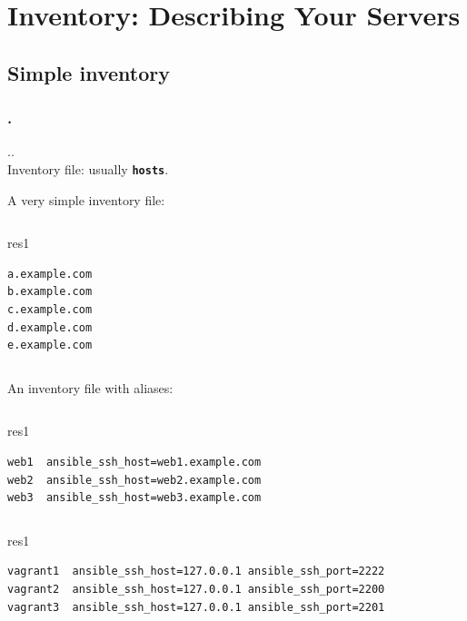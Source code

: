\documentclass[pdf, 8pt, unicode, t]{beamer} %
\newcommand{\bluetext}[1]{{\usebeamercolor[fg]{bluetext_color}#1}}
\newcommand{\myinsertsubsection}{\alert{\Large\insertsectionnumber.\insertsubsectionnumber. \insertsubsection}\\}
\newcommand{\frametitlesection}{\frametitle{\thesection. \secname}}
\begin{document}
\section{Inventory: Describing Your Servers}
\subsection{Simple inventory}
\begin{frame}[fragile]
\frametitlesection
\myinsertsubsection
\vspace{1em}
\bluetext{Inventory file: usually {\bf\texttt{hosts}}.}

\vspace{1em}
A very simple inventory file:
\begin{columns}[t,onlytextwidth]
\hspace{1em}
\begin{beamercolorbox}[dp=1ex,wd=0.43\textwidth,sep=-0.5em,rounded=true,shadow=true,center]{res1}
\begin{Verbatim}[commandchars=\\\{\}]
a.example.com
b.example.com
c.example.com
d.example.com
e.example.com
\end{Verbatim}
\end{beamercolorbox}
\end{columns}

\vspace{1em}
An inventory file with aliases:

\begin{columns}[t,onlytextwidth]
\hspace{1em}
\begin{beamercolorbox}[dp=1ex,wd=0.8\textwidth,sep=-0.5em,rounded=true,shadow=true,center]{res1}
\begin{Verbatim}[commandchars=\\\{\}]
web1  ansible_ssh_host=web1.example.com
web2  ansible_ssh_host=web2.example.com
web3  ansible_ssh_host=web3.example.com
\end{Verbatim}
\end{beamercolorbox}
\end{columns}
\hspace{1em}
\vspace{-0.5em}
\begin{columns}[t,onlytextwidth]
\hspace{1em}
\begin{beamercolorbox}[dp=1ex,wd=0.87\textwidth,sep=-0.5em,rounded=true,shadow=true,center]{res1}
\begin{Verbatim}[commandchars=\\\{\}]
vagrant1  ansible_ssh_host=127.0.0.1 ansible_ssh_port=2222
vagrant2  ansible_ssh_host=127.0.0.1 ansible_ssh_port=2200
vagrant3  ansible_ssh_host=127.0.0.1 ansible_ssh_port=2201
\end{Verbatim}
\end{beamercolorbox}
\end{columns}
\end{frame}
\end{document}
